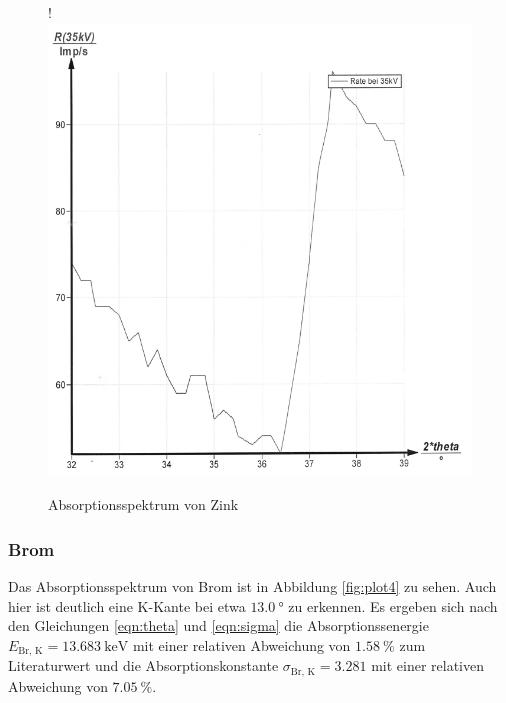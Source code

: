 \begin{figure}[H]!
  \centering
  \includegraphics[scale=0.3]{content/bild7.png}
  \caption{Absorptionsspektrum von Zink}
  \label{fig:plot3}
\end{figure}

\subsubsection{Brom}

Das Absorptionsspektrum von Brom ist in Abbildung \ref{fig:plot4} zu sehen.
Auch hier ist deutlich eine K-Kante bei etwa $\SI{13.0}{\degree}$ zu erkennen.
Es ergeben sich nach den Gleichungen \eqref{eqn:theta} und \eqref{eqn:sigma}
die Absorptionssenergie $ E_\text{Br, K} = \SI{13.683}{\kilo\eV}$ mit einer 
relativen Abweichung von $\SI{1.58}{\percent}$ zum Literaturwert und die 
Absorptionskonstante $\sigma_\text{Br, K} = 3.281$ mit einer relativen
Abweichung von $\SI{7.05}{\percent}$.

